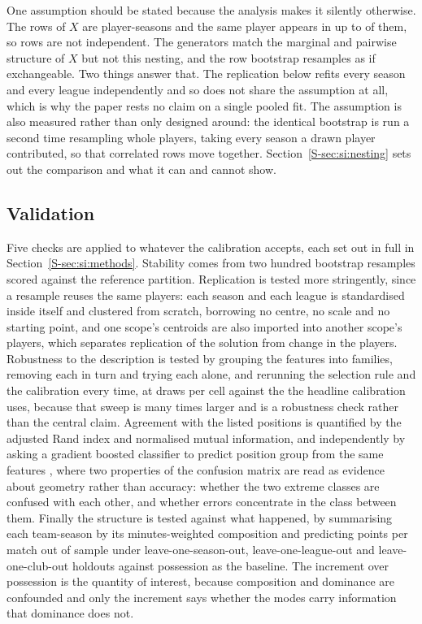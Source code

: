 One assumption should be stated because the analysis makes it silently otherwise. The rows of
$X$ are player-seasons and the same player appears in up to \ArcNSeasonsWord{} of them, so rows
are not independent. The generators match the marginal and pairwise structure of $X$ but not this
nesting, and the row bootstrap resamples as if exchangeable. Two things answer that. The
replication below refits every season and every league independently and so does not share the
assumption at all, which is why the paper rests no claim on a single pooled fit. The assumption
is also measured rather than only designed around: the identical bootstrap is run a second time
resampling whole players, taking every season a drawn player contributed, so that correlated
rows move together. Section~\ref{S-sec:si:nesting} sets out the comparison and what it can and
cannot show.

\subsection{Validation}

Five checks are applied to whatever the calibration accepts, each set out in full in
Section~\ref{S-sec:si:methods}. Stability comes from two hundred bootstrap resamples scored
against the reference partition. Replication is tested more stringently, since a resample reuses
the same players: each season and each league is standardised inside itself and clustered from
scratch, borrowing no centre, no scale and no starting point, and one scope's centroids are also
imported into another scope's players, which separates replication of the solution from change
in the players. Robustness to the description is tested by grouping the features into
\AblFamiliesWord{} families, removing each in turn and trying each alone, and rerunning the
selection rule and the calibration every time, at \AblSimulations{} draws per cell against the
\StrSimulations{} the headline calibration uses, because that sweep is many times larger and is
a robustness check rather than the central claim. Agreement with the listed positions is quantified by the adjusted Rand
index and normalised mutual information, and independently by asking a gradient boosted
classifier to predict position group from the same features \citep{ke2017lightgbm,
lundberg2017unified}, where two properties of the confusion matrix are read as evidence about
geometry rather than accuracy: whether the two extreme classes are confused with each other, and
whether errors concentrate in the class between them. Finally the structure is tested against
what happened, by summarising each team-season by its minutes-weighted composition and
predicting points per match out of sample under leave-one-season-out, leave-one-league-out and
leave-one-club-out holdouts against possession as the baseline. The increment over possession is
the quantity of interest, because composition and dominance are confounded and only the
increment says whether the modes carry information that dominance does not.

